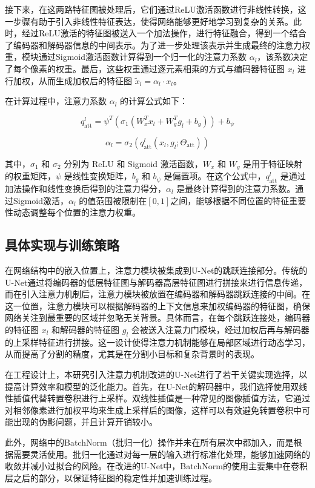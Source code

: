 接下来，在这两路特征图被处理后，它们通过ReLU激活函数进行非线性转换，这一步骤有助于引入非线性特征表达，使得网络能够更好地学习到复杂的关系。此时，经过ReLU激活的特征图被送入一个加法操作，进行特征融合，得到一个结合了编码器和解码器信息的中间表示。为了进一步处理该表示并生成最终的注意力权重，模块通过Sigmoid激活函数计算得到一个归一化的注意力系数 $\alpha_l$，该系数决定了每个像素的权重。最后，这些权重通过逐元素相乘的方式与编码器特征图 $x_l$ 进行加权，从而生成加权后的特征图 $\tilde{x}_l = \alpha_l \cdot x_l$。

在计算过程中，注意力系数 $\alpha_l$ 的计算公式如下：

\begin{equation}
    q_{\text{att}}^l = \psi^T \left( \sigma_1 (W_x^T x_l + W_g^T g_l + b_g) \right) + b_\psi
\end{equation}

\begin{equation}
    \alpha_l = \sigma_2 \left( q_{\text{att}}^l(x_l, g_l; \Theta_{\text{att}}) \right)
\end{equation}

其中，$\sigma_1$ 和 $\sigma_2$ 分别为 ReLU 和 Sigmoid 激活函数，$W_x$ 和 $W_g$ 是用于特征映射的权重矩阵，$\psi$ 是线性变换矩阵，$b_g$ 和 $b_\psi$ 是偏置项。在这个公式中，$q_{\text{att}}^l$ 是通过加法操作和线性变换后得到的注意力得分，$\alpha_l$ 是最终计算得到的注意力系数。通过Sigmoid激活，$\alpha_l$ 的值范围被限制在$[0, 1]$之间，能够根据不同位置的特征重要性动态调整每个位置的注意力权重。


\subsection{具体实现与训练策略}

在网络结构中的嵌入位置上，注意力模块被集成到U-Net的跳跃连接部分。传统的U-Net通过将编码器的低层特征图与解码器高层特征图进行拼接来进行信息传递，而在引入注意力机制后，注意力模块被放置在编码器和解码器跳跃连接的中间。在这一位置，注意力模块可以根据解码器的上下文信息来加权编码器的特征图，确保网络关注到最重要的区域并忽略无关背景。具体而言，在每个跳跃连接处，编码器的特征图 $x_l$ 和解码器的特征图 $g_l$ 会被送入注意力门模块，经过加权后再与解码器的上采样特征进行拼接。这一设计使得注意力机制能够在局部区域进行动态学习，从而提高了分割的精度，尤其是在分割小目标和复杂背景时的表现。

在工程设计上，本研究引入注意力机制改进的U-Net进行了若干关键实现选择，以提高计算效率和模型的泛化能力。首先，在U-Net的解码器中，我们选择使用双线性插值代替转置卷积进行上采样。双线性插值是一种常见的图像插值方法，它通过对相邻像素进行加权平均来生成上采样后的图像，这样可以有效避免转置卷积中可能出现的伪影问题，并且计算开销较小。

此外，网络中的BatchNorm（批归一化）操作并未在所有层次中都加入，而是根据需要灵活使用。批归一化通过对每一层的输入进行标准化处理，能够加速网络的收敛并减小过拟合的风险。在改进的U-Net中，BatchNorm的使用主要集中在卷积层之后的部分，以保证特征图的稳定性并加速训练过程。